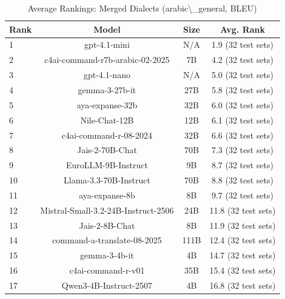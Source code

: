 \begin{table}[htbp]
\centering
\caption{Average Rankings: Merged Dialects (arabic\textbackslash{}_general, BLEU)}
\label{tab:avg_rankings_bleu_arabic_general}
\begin{tabular}{l@{\hspace{3pt}}c@{\hspace{3pt}}c@{\hspace{3pt}}c}
\toprule
Rank & Model & Size & Avg. Rank \\
\midrule
1 & gpt-4.1-mini & N/A & 1.9 (32 test sets) \\
2 & c4ai-command-r7b-arabic-02-2025 & 7B & 4.2 (32 test sets) \\
3 & gpt-4.1-nano & N/A & 5.0 (32 test sets) \\
4 & gemma-3-27b-it & 27B & 5.8 (32 test sets) \\
5 & aya-expanse-32b & 32B & 6.0 (32 test sets) \\
6 & Nile-Chat-12B & 12B & 6.1 (32 test sets) \\
7 & c4ai-command-r-08-2024 & 32B & 6.6 (32 test sets) \\
8 & Jais-2-70B-Chat & 70B & 7.3 (32 test sets) \\
9 & EuroLLM-9B-Instruct & 9B & 8.7 (32 test sets) \\
10 & Llama-3.3-70B-Instruct & 70B & 8.8 (32 test sets) \\
11 & aya-expanse-8b & 8B & 9.7 (32 test sets) \\
12 & Mistral-Small-3.2-24B-Instruct-2506 & 24B & 11.8 (32 test sets) \\
13 & Jais-2-8B-Chat & 8B & 11.9 (32 test sets) \\
14 & command-a-translate-08-2025 & 111B & 12.4 (32 test sets) \\
15 & gemma-3-4b-it & 4B & 14.7 (32 test sets) \\
16 & c4ai-command-r-v01 & 35B & 15.4 (32 test sets) \\
17 & Qwen3-4B-Instruct-2507 & 4B & 16.8 (32 test sets) \\
\bottomrule
\end{tabular}
\end{table}